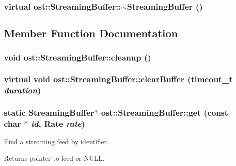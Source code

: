 \subsubsection[{$\sim$StreamingBuffer}]{\setlength{\rightskip}{0pt plus 5cm}virtual ost::StreamingBuffer::$\sim$StreamingBuffer ()\hspace{0.3cm}{\ttfamily  [protected, virtual]}}\label{classost_1_1_streaming_buffer_a225f8cbff0bfd610352ae5d06cb8243d}


\subsection{Member Function Documentation}
\subsubsection[{cleanup}]{\setlength{\rightskip}{0pt plus 5cm}void ost::StreamingBuffer::cleanup ()\hspace{0.3cm}{\ttfamily  [protected]}}\label{classost_1_1_streaming_buffer_aa00daa9a1d0813bbc423422fd95fd064}
\subsubsection[{clearBuffer}]{\setlength{\rightskip}{0pt plus 5cm}virtual void ost::StreamingBuffer::clearBuffer (timeout\_\-t {\em duration})\hspace{0.3cm}{\ttfamily  [protected, virtual]}}\label{classost_1_1_streaming_buffer_a08ad12941ee594e607394c8e4391b582}
\subsubsection[{get}]{\setlength{\rightskip}{0pt plus 5cm}static {\bf StreamingBuffer}$\ast$ ost::StreamingBuffer::get (const char $\ast$ {\em id}, \/  Rate {\em rate})\hspace{0.3cm}{\ttfamily  [static]}}\label{classost_1_1_streaming_buffer_a911284b4cdcd93886472b64fea99bd49}


Find a streaming feed by identifier. \begin{DoxyReturn}{Returns}
pointer to feed or NULL. 
\end{DoxyReturn}

